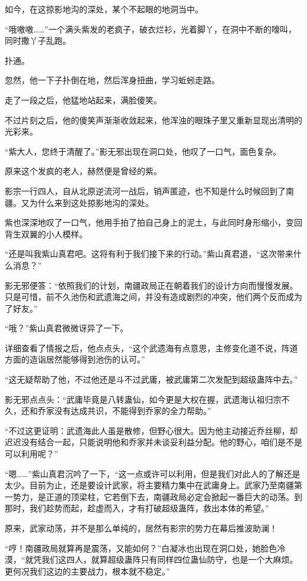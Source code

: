 \begin{this_body}
如今，在这掠影地沟的深处，某个不起眼的地洞当中。

“哦嗷嗷……”一个满头紫发的老疯子，破衣烂衫，光着脚丫，在洞中不断的嚎叫，同时撒丫子乱跑。

扑通。

忽然，他一下子扑倒在地，然后浑身扭曲，学习蚯蚓走路。

走了一段之后，他猛地站起来，满脸傻笑。

不过片刻之后，他的傻笑声渐渐收敛起来，他浑浊的眼珠子里又重新显现出清明的光彩来。

“紫大人，您终于清醒了。”影无邪出现在洞口处，他叹了一口气，面色复杂。

原来这个发疯的老人，赫然便是曾经的紫。

影宗一行四人，自从北原逆流河一战后，销声匿迹，也不知是什么时候回到了南疆。又为什么来到这处掠影地沟的深处。

紫也深深地叹了一口气，他用手拍了拍自己身上的泥土，与此同时身形缩小，变回背生双翼的小人模样。

“还是叫我紫山真君吧。这将有利于我们接下来的行动。”紫山真君道，“这次带来什么消息？”

影无邪便答：“依照我们的计划，南疆政局正在朝着我们的设计方向而慢慢发展。只是可惜，前不久池伤和武遗海之间，并没有造成剧烈的冲突，他们两个反而成为了好友。”

“哦？”紫山真君微微讶异了一下。

详细查看了情报之后，他点点头，“这个武遗海有点意思，主修变化道不说，阵道方面的造诣居然能够得到池伤的认可。”

“这无疑帮助了他，不过他还是斗不过武庸，被武庸第二次发配到超级蛊阵中去。”

影无邪点点头：“武庸毕竟是八转蛊仙，如今更是大权在握，武遗海认祖归宗不久，还和乔家没有达成共识，不能得到乔家的全力帮助。”

“不过这更证明：武遗海此人虽是散修，但野心很大。因为他主动接近乔丝柳，却迟迟没有结合一起，只能说明他和乔家并未谈妥利益分配。他的野心，咱们是不是可以利用呢？”

“嗯……”紫山真君沉吟了一下，“这一点或许可以利用，但是我们对此人的了解还是太少。目前为止，还是要设计武家，将主要精力集中在武庸身上。武家乃至南疆第一势力，是正道的顶梁柱，它若倒下去，南疆政局必定会掀起一番巨大的动荡。到那时，我们趁势而起，趁虚而入，才有打破超级蛊阵，救出本体的希望。”

原来，武家动荡，并不是那么单纯的，居然有影宗的势力在幕后推波助澜！

“哼！南疆政局就算再是震荡，又能如何？”白凝冰也出现在洞口处，她脸色冷漠，“就凭我们这四人，就算超级蛊阵只有同样四位蛊仙防守，也是一个大麻烦。更何况我们这边的主要战力，根本就不稳定。”


\end{this_body}
